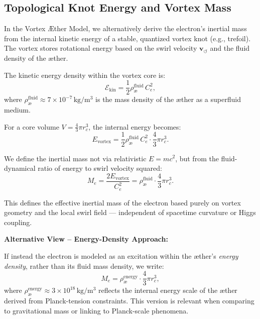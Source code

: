 \subsection{Topological Knot Energy and Vortex Mass}
\label{sec:mass-knot}

In the Vortex Æther Model, we alternatively derive the electron's inertial mass from the internal kinetic energy of a stable, quantized vortex knot (e.g., trefoil). The vortex stores rotational energy based on the swirl velocity \( \mathbf{v}_{\scriptscriptstyle\boldsymbol{\circlearrowleft}} \) and the fluid density of the æther.

The kinetic energy density within the vortex core is:
\begin{equation*}
    \mathcal{E}_{\text{kin}} = \frac{1}{2} \rho_\text{\ae}^{\text{fluid}} \, C_e^2,
\end{equation*}
where \( \rho_\text{\ae}^{\text{fluid}} \approx 7 \times 10^{-7} \, \mathrm{kg/m^3} \) is the mass density of the æther as a superfluid medium.

For a core volume \( V = \frac{4}{3} \pi r_c^3 \), the internal energy becomes:
\begin{equation*}
    E_{\text{vortex}} = \frac{1}{2} \rho_\text{\ae}^{\text{fluid}} \, C_e^2 \cdot \frac{4}{3} \pi r_c^3.
\end{equation*}

We define the inertial mass not via relativistic \( E = mc^2 \), but from the fluid-dynamical ratio of energy to swirl velocity squared:
\begin{equation}
    M_e = \frac{2 E_{\text{vortex}}}{C_e^2} = \rho_\text{\ae}^{\text{fluid}} \cdot \frac{4}{3} \pi r_c^3.
\end{equation}

This defines the effective inertial mass of the electron based purely on vortex geometry and the local swirl field — independent of spacetime curvature or Higgs coupling.

\vspace{1em}

\textbf{Alternative View – Energy-Density Approach:}

If instead the electron is modeled as an excitation within the æther’s \textit{energy density}, rather than its fluid mass density, we write:
\begin{equation}
    M_e = \rho_\text{\ae}^{\text{energy}} \cdot \frac{4}{3} \pi r_c^3,
\end{equation}
where \( \rho_\text{\ae}^{\text{energy}} \approx 3 \times 10^{18} \, \mathrm{kg/m^3} \) reflects the internal energy scale of the æther derived from Planck-tension constraints. This version is relevant when comparing to gravitational mass or linking to Planck-scale phenomena.


